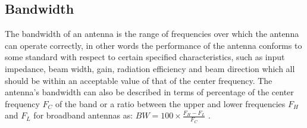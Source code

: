 \subsection{Bandwidth}
The bandwidth of an antenna is the range of frequencies over which the antenna can operate correctly, in other words the performance of the antenna conforms to some standard with respect to certain specified characteristics, such as input impedance, beam width, gain, radiation efficiency and beam direction which all should be within an acceptable value of that of the center frequency. The antenna’s bandwidth can also be described in terms of percentage of the center frequency $F_{C}$ of the band or a ratio between the upper and lower frequencies $F_{H}$  and $F_{L}$ for broadband antennas as: $BW=100  \times \frac{F_{H}-F_{L}}{F_{C}}$ .
